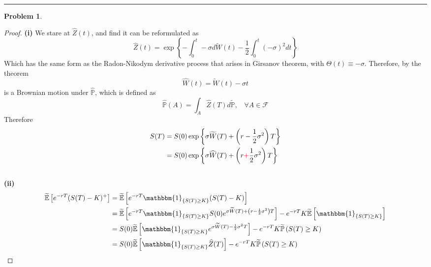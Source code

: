 \documentclass[a4paper, 10pt]{article}
\theoremstyle{definition}
\newtheorem{problem}{Problem}
\theoremstyle{hSol}
\begin{document}
\noindent\rule{16cm}{0.4pt}
\begin{problem} 
\end{problem}
\begin{proof} \textbf{(i)} We stare at $\widehat{Z}(t)$, and find it can be reformulated as
\begin{equation}
  \widehat{Z}(t) = \exp \left\{-\int_0^t -\sigma d\widetilde{W}(t) - \frac{1}{2}\int_0^t (-\sigma)^2 dt\right\}
\end{equation}
Which has the same form as the Radon-Nikodym derivative process that arises in Girsanov theorem, with $\Theta(t) \equiv -\sigma$. Therefore, by the theorem
\begin{equation}
  \widehat{W}(t) = \widetilde{W}(t) - \sigma t
\end{equation}
is a Brownian motion under $\widehat{\mathbb{P}}$, which is defined as
\begin{equation}
  \widehat{\mathbb{P}}(A) = \int_A \widehat{Z}(T) d \widetilde{\mathbb{P}},~~~~\forall A \in \mathcal{F}
\end{equation}
Therefore
\begin{equation}\label{shat}
  \begin{split}
    S(T) &= S(0) \exp\left\{\sigma \widetilde{W}(T) + \left(r-\frac{1}{2}\sigma^2\right)T\right\} \\
    &=S(0) \exp\left\{\sigma \widehat{W}(T) + \left(r\textcolor{red}{+}\frac{1}{2}\sigma^2\right)T\right\}
  \end{split}
\end{equation}
~\\
\textbf{(ii)} 
\begin{equation}
  \begin{split}
    \widetilde{\mathbb{E}}\left[e^{-rT}(S(T)-K)^+\right] &= \widetilde{\mathbb{E}}\left[e^{-rT}\mathbbm{1}_{\{S(T)\geq K\}}(S(T)-K)\right] \\
    &= \widetilde{\mathbb{E}}\left[e^{-rT}\mathbbm{1}_{\{S(T)\geq K\}}S(0)e^{\sigma \widetilde{W}(T) + \left(r-\frac{1}{2}\sigma^2\right)T}\right] - e^{-rT}K\widetilde{\mathbb{E}}\left[\mathbbm{1}_{\{S(T)\geq K\}}\right]\\
    &= S(0)\widetilde{\mathbb{E}}\left[\mathbbm{1}_{\{S(T)\geq K\}}e^{\sigma \widetilde{W}(T) - \frac{1}{2}\sigma^2T}\right] - e^{-rT}K \widetilde{\mathbb{P}}\left(S(T)\geq K\right) \\
    &= S(0)\widetilde{\mathbb{E}}\left[\mathbbm{1}_{\{S(T)\geq K\}}\widehat{Z}(T)\right] - e^{-rT}K \widetilde{\mathbb{P}}\left(S(T)\geq K\right) \\

\end{split}
\end{equation}
\end{proof}
\end{document}
